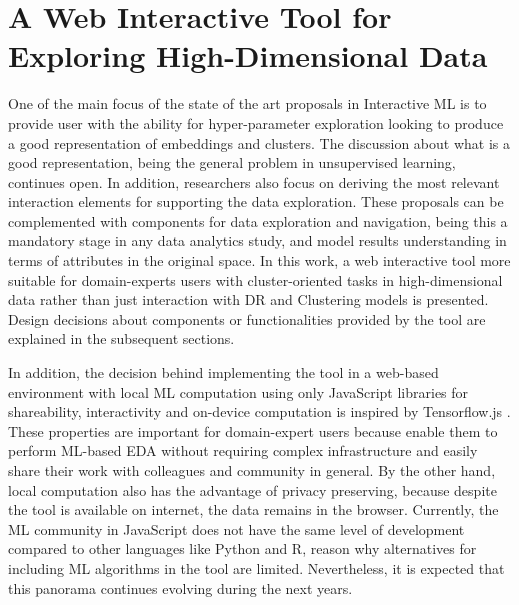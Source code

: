 \chapter{A Web Interactive Tool for Exploring High-Dimensional Data}
\label{chapter4}

\graphicspath{{Chapter4/figs/}}

One of the main focus of the state of the art proposals in Interactive ML is to provide user with the ability for hyper-parameter exploration looking to produce a good representation of embeddings and clusters. The discussion about what is a good representation, being the general problem in unsupervised learning, continues open. In addition, researchers also focus on deriving the most relevant interaction elements for supporting the data exploration. These proposals can be complemented with components for data exploration and navigation, being this a mandatory stage in any data analytics study, and model results understanding in terms of attributes in the original space.  In this work, a web interactive tool more suitable for domain-experts users with cluster-oriented tasks in high-dimensional data rather than just interaction with DR and Clustering models is presented. Design decisions about components or functionalities provided by the tool are explained in the subsequent sections. 

In addition, the decision behind implementing the tool in a web-based environment with local ML computation using only JavaScript libraries for shareability, interactivity and on-device computation is inspired by Tensorflow.js \cite{Smilkov2019TensorFlow.js:Beyond}. These properties are important for domain-expert users because enable them to perform ML-based EDA without requiring complex infrastructure and easily share their work with colleagues and community in general. By the other hand, local computation also has the advantage of privacy preserving, because despite the tool is available on internet, the data remains in the browser. Currently, the ML community in JavaScript does not have the same level of development compared to other languages like Python and R, reason why alternatives for including ML algorithms in the tool are limited. Nevertheless, it is expected that this panorama continues evolving during the next years.

